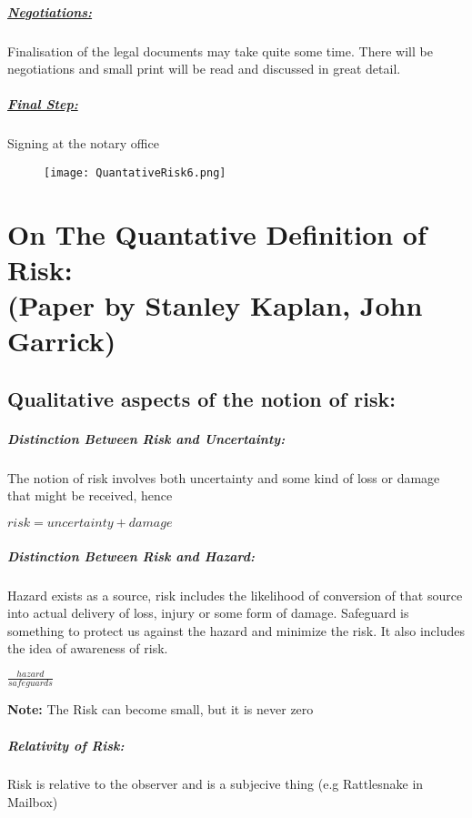 \documentclass[8pt]{extreport}
\begin{document}
{\paragraph{\underline{Negotiations:}} Finalisation of the legal documents may take quite some time. There will be negotiations and small print will be read and discussed in great detail.
\paragraph{\underline{Final Step:}} Signing at the notary office
\begin{figure}[h!]
  \centering\texttt{[image: QuantativeRisk6.png]}
  \caption{}
  \label{scenarioList}
\end{figure}
\chapter{\Large{On The Quantative Definition of Risk:}\\ \normalsize{(Paper by Stanley Kaplan, John Garrick)}}
\section{\large{Qualitative aspects of the notion of risk:}}
\paragraph{Distinction Between Risk and Uncertainty:} The notion of risk involves both uncertainty and some kind of loss or damage that might be received, hence
\begin{center}
$ risk = uncertainty + damage$
 \end{center}
\paragraph{Distinction Between Risk and Hazard:} Hazard exists as a source, risk includes the likelihood of conversion of that source into actual delivery of loss, injury or some form of damage. Safeguard is something to protect us against the hazard and minimize the risk. It also includes the idea of awareness of risk.
\begin{center}
$\frac{hazard}{safeguards}$
\end{center}
\textbf{Note:} The Risk can become small, but it is never zero
\paragraph{Relativity of Risk:} Risk is relative to the observer and is a subjecive thing (e.g Rattlesnake in Mailbox)
}
\end{document}
